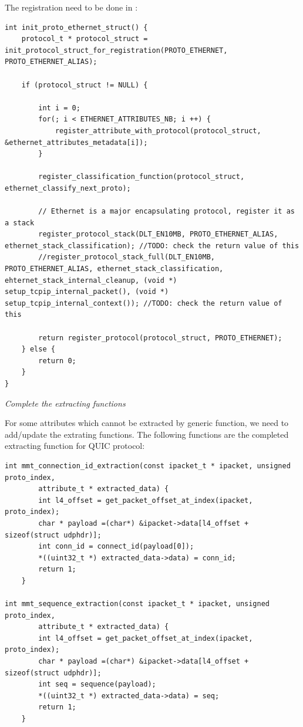 The registration need to be done in :

\begin{lstlisting}[style=Cpp]
int init_proto_ethernet_struct() {
    protocol_t * protocol_struct = init_protocol_struct_for_registration(PROTO_ETHERNET, PROTO_ETHERNET_ALIAS);

    if (protocol_struct != NULL) {

        int i = 0;
        for(; i < ETHERNET_ATTRIBUTES_NB; i ++) {
            register_attribute_with_protocol(protocol_struct, &ethernet_attributes_metadata[i]);
        }

        register_classification_function(protocol_struct, ethernet_classify_next_proto);

        // Ethernet is a major encapsulating protocol, register it as a stack
        register_protocol_stack(DLT_EN10MB, PROTO_ETHERNET_ALIAS, ethernet_stack_classification); //TODO: check the return value of this
        //register_protocol_stack_full(DLT_EN10MB, PROTO_ETHERNET_ALIAS, ethernet_stack_classification, ehternet_stack_internal_cleanup, (void *) setup_tcpip_internal_packet(), (void *) setup_tcpip_internal_context()); //TODO: check the return value of this

        return register_protocol(protocol_struct, PROTO_ETHERNET);
    } else {
        return 0;
    }
}
\end{lstlisting}

\textit{Complete the extracting functions}

For some attributes which cannot be extracted by generic function, we need to add/update the extrating functions. The following functions are the completed extracting function for QUIC protocol:

\begin{lstlisting}[style=Cpp]
int mmt_connection_id_extraction(const ipacket_t * ipacket, unsigned proto_index,
        attribute_t * extracted_data) {
        int l4_offset = get_packet_offset_at_index(ipacket, proto_index);
        char * payload =(char*) &ipacket->data[l4_offset + sizeof(struct udphdr)];
        int conn_id = connect_id(payload[0]);
        *((uint32_t *) extracted_data->data) = conn_id;
        return 1;
    }

int mmt_sequence_extraction(const ipacket_t * ipacket, unsigned proto_index,
        attribute_t * extracted_data) {
        int l4_offset = get_packet_offset_at_index(ipacket, proto_index);
        char * payload =(char*) &ipacket->data[l4_offset + sizeof(struct udphdr)];
        int seq = sequence(payload);
        *((uint32_t *) extracted_data->data) = seq;
        return 1;
    }
\end{lstlisting}

